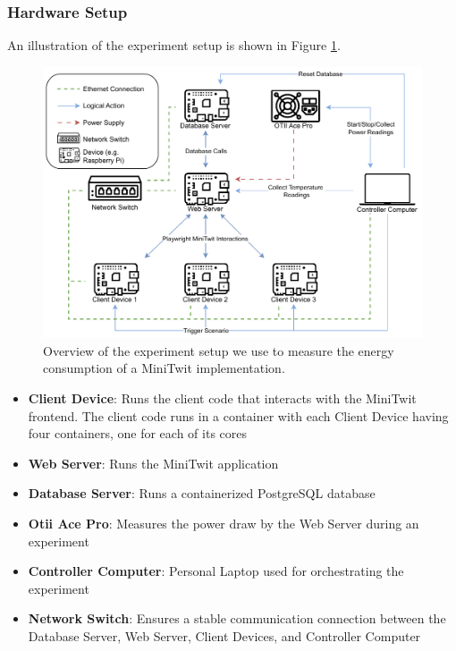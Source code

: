 \documentclass[main.tex]{subfiles}
\begin{document}
\subsubsection{Hardware Setup}
An illustration of the experiment setup is shown in Figure \ref{fig:experiment-setup}.

\begin{figure}[]
    \centering
    \includegraphics[width=1\linewidth]{media/experiment/experiment-Setup.pdf}
    \caption{Overview of the experiment setup we use to measure the energy consumption of a MiniTwit implementation.}
    \label{fig:experiment-setup}
\end{figure}

\begin{itemize}
    \item \textbf{Client Device}: Runs the client code that interacts with the MiniTwit frontend. The client code runs in a container with each Client Device having four containers, one for each of its cores
    \item \textbf{Web Server}: Runs the MiniTwit application
    \item \textbf{Database Server}: Runs a containerized PostgreSQL database
    \item \textbf{Otii Ace Pro\cite{qoitech_otii_ace_pro}}: Measures the power draw by the Web Server during an experiment
    \item \textbf{Controller Computer}: Personal Laptop used for orchestrating the experiment
    \item \textbf{Network Switch}: Ensures a stable communication connection between the Database Server, Web Server, Client Devices, and Controller Computer
\end{itemize}
\end{document}
